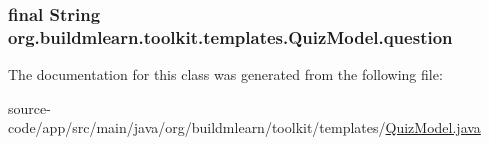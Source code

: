 \subsubsection[{\texorpdfstring{question}{question}}]{\setlength{\rightskip}{0pt plus 5cm}final String org.\+buildmlearn.\+toolkit.\+templates.\+Quiz\+Model.\+question\hspace{0.3cm}{\ttfamily [private]}}\hypertarget{classorg_1_1buildmlearn_1_1toolkit_1_1templates_1_1QuizModel_a568dd3dc8d183927ffff7e8da7d45895}{}\label{classorg_1_1buildmlearn_1_1toolkit_1_1templates_1_1QuizModel_a568dd3dc8d183927ffff7e8da7d45895}


The documentation for this class was generated from the following file\+:\begin{DoxyCompactItemize}
\item 
source-\/code/app/src/main/java/org/buildmlearn/toolkit/templates/\hyperlink{templates_2QuizModel_8java}{Quiz\+Model.\+java}\end{DoxyCompactItemize}
